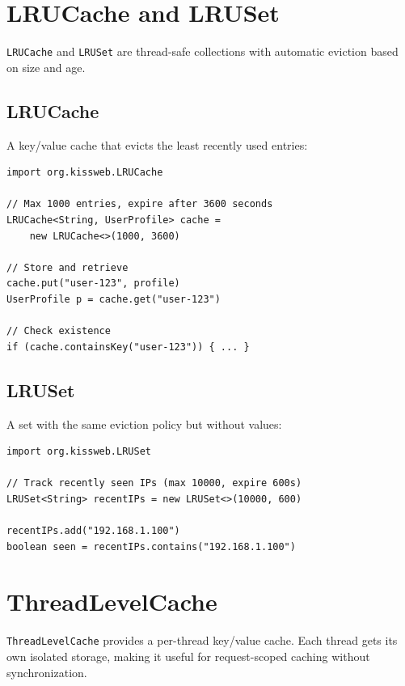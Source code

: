 \section{LRUCache and LRUSet}
\label{sec:util-lru}

\texttt{LRUCache} and \texttt{LRUSet} are thread-safe collections with automatic eviction based on size and age.

\subsection{LRUCache}

A key/value cache that evicts the least recently used entries:

\begin{lstlisting}[style=groovy]
import org.kissweb.LRUCache

// Max 1000 entries, expire after 3600 seconds
LRUCache<String, UserProfile> cache =
    new LRUCache<>(1000, 3600)

// Store and retrieve
cache.put("user-123", profile)
UserProfile p = cache.get("user-123")

// Check existence
if (cache.containsKey("user-123")) { ... }
\end{lstlisting}

\subsection{LRUSet}

A set with the same eviction policy but without values:

\begin{lstlisting}[style=groovy]
import org.kissweb.LRUSet

// Track recently seen IPs (max 10000, expire 600s)
LRUSet<String> recentIPs = new LRUSet<>(10000, 600)

recentIPs.add("192.168.1.100")
boolean seen = recentIPs.contains("192.168.1.100")
\end{lstlisting}

\section{ThreadLevelCache}
\label{sec:util-threadcache}

\texttt{ThreadLevelCache} provides a per-thread key/value cache.  Each thread gets its own isolated storage, making it useful for request-scoped caching without synchronization.

